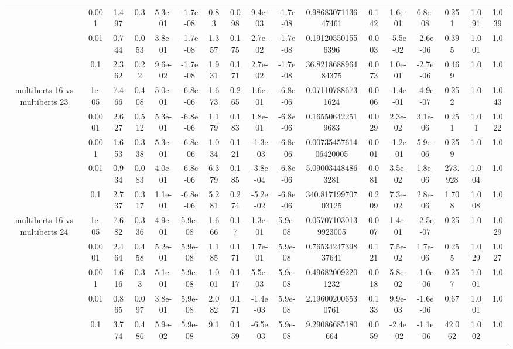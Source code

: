 \begin{tabular}{|c|c|c|c|c|c|c|c|c|c|c|c|c|c|c|c|c|}
 & 0.001 & 1.497 & 0.3 & 5.3e-01 & -1.7e-08 & 0.83 & 0.098 & 9.4e-03 & -1.7e-08 & 0.9868307113647461 & 0.142 & 1.6e-01 & 6.8e-08 & 0.251 & 1.091 & 1.039 \\
 & 0.01 & 0.744 & 0.053 & 3.8e-01 & -1.7e-08 & 1.357 & 0.175 & 2.7e-02 & -1.7e-08 & 0.191205501556396 & 0.003 & -5.5e-02 & -2.6e-06 & 0.395 & 1.001 & 1.0 \\
 & 0.1 & 2.362 & 0.22 & 9.6e-02 & -1.7e-08 & 1.931 & 0.171 & 2.7e-02 & -1.7e-08 & 36.821868896484375 & 0.073 & 1.0e-01 & -2.7e-06 & 0.469 & 1.0 & 1.0 \\
\hline
\multirow{5}{*}{multiberts 16 vs multiberts 23} & 1e-05 & 7.466 & 0.408 & 5.0e-01 & -6.8e-06 & 1.673 & 0.265 & 1.6e-01 & -6.8e-06 & 0.071107886731624 & 0.006 & -1.4e-01 & -4.9e-07 & 0.252 & 1.0 & 1.043 \\
 & 0.0001 & 2.627 & 0.512 & 5.3e-01 & -6.8e-06 & 1.179 & 0.183 & 1.8e-01 & -6.8e-06 & 0.165506422519683 & 0.029 & 2.3e-02 & 3.1e-06 & 0.251 & 1.01 & 1.022 \\
 & 0.001 & 1.653 & 0.338 & 5.3e-01 & -6.8e-06 & 1.034 & 0.121 & -1.3e-03 & -6.8e-06 & 0.0073545761406420005 & 0.001 & -1.2e-01 & 5.9e-06 & 0.259 & 1.0 & 1.0 \\
 & 0.01 & 0.934 & 0.083 & 4.0e-01 & -6.8e-06 & 6.379 & 0.185 & -3.8e-04 & -6.8e-06 & 5.090034484863281 & 0.081 & 3.5e-02 & 1.8e-06 & 273.928 & 1.004 & 1.0 \\
 & 0.1 & 2.737 & 0.317 & 1.1e-01 & -6.8e-06 & 5.281 & 0.274 & -5.2e-02 & -6.8e-06 & 340.81719970703125 & 0.209 & 7.3e-02 & 2.8e-06 & 1.708 & 1.008 & 1.0 \\
\hline
\multirow{5}{*}{multiberts 16 vs multiberts 24} & 1e-05 & 7.682 & 0.336 & 4.9e-01 & 5.9e-08 & 1.666 & 0.17 & 1.3e-01 & 5.9e-08 & 0.057071030139923005 & 0.007 & 1.4e-01 & -2.5e-07 & 0.25 & 1.0 & 1.029 \\
 & 0.0001 & 2.464 & 0.458 & 5.2e-01 & 5.9e-08 & 1.185 & 0.171 & 1.7e-01 & 5.9e-08 & 0.7653424739837641 & 0.121 & 7.5e-02 & 1.7e-06 & 0.255 & 1.029 & 1.027 \\
 & 0.001 & 1.616 & 0.33 & 5.1e-01 & 5.9e-08 & 1.001 & 0.117 & 5.5e-03 & 5.9e-08 & 0.496820092201232 & 0.018 & 5.8e-02 & -1.0e-06 & 0.257 & 1.001 & 1.0 \\
 & 0.01 & 0.865 & 0.097 & 3.8e-01 & 5.9e-08 & 2.082 & 0.171 & -1.4e-03 & 5.9e-08 & 2.196002006530761 & 0.133 & 9.9e-03 & -1.6e-06 & 0.67 & 1.001 & 1.0 \\
 & 0.1 & 3.774 & 0.486 & 5.9e-02 & 5.9e-08 & 9.1 & 0.159 & -6.5e-03 & 5.9e-08 & 9.29086685180664 & 0.059 & -2.4e-02 & -1.1e-06 & 42.062 & 1.002 & 1.0 \\

\end{tabular}
